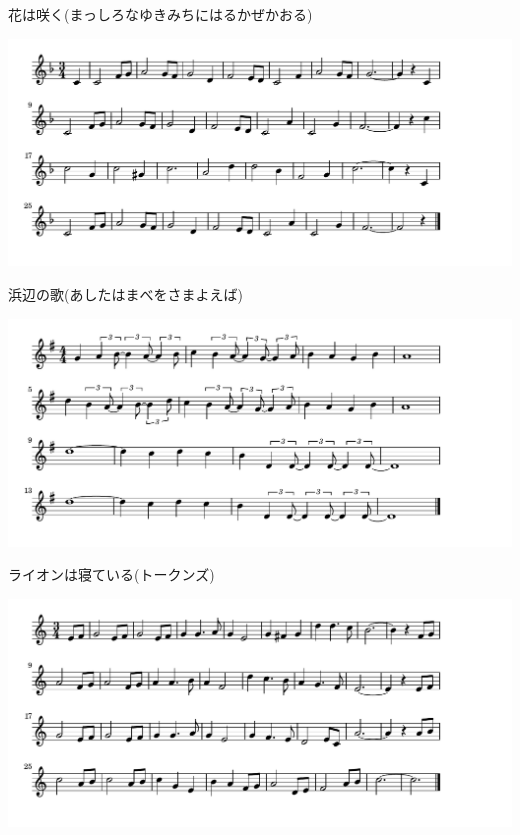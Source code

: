 \documentclass[a4paper]{ltjsarticle}
\begin{document}
\vspace{-10mm} \hspace{10mm}
花は咲く(まっしろなゆきみちにはるかぜかおる)

\includegraphics[clip]{hamabe_crop.pdf}

\vspace{-10mm} \hspace{10mm}
浜辺の歌(あしたはまべをさまよえば)

\includegraphics[clip]{lionsleeps_crop.pdf}

\vspace{-10mm} \hspace{10mm}
ライオンは寝ている(トークンズ)

\includegraphics[clip]{lalalu_crop.pdf}
\end{document}
